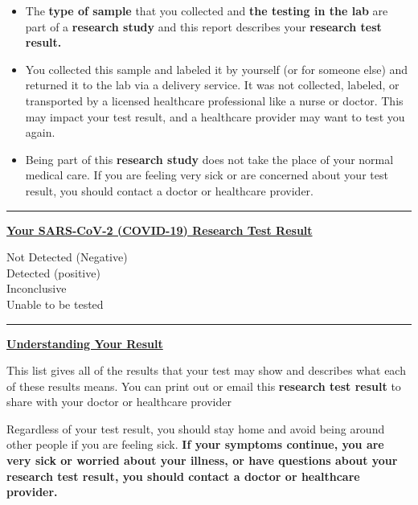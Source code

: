\documentclass[10pt]{article}
\newcommand{\PageLine}{\rule{\textwidth}{0.25mm}}
\begin{document}
\begin{itemize}
\item

  The \textbf{type of sample} that you collected and \textbf{the testing in the
  lab} are part of a \textbf{research study} and this report describes your
  \textbf{research test result.}

\item

  You collected this sample and labeled it by yourself (or for someone else) and
  returned it to the lab via a delivery service. It was not collected, labeled,
  or transported by a licensed healthcare professional like a nurse or doctor.
  This may impact your test result, and a healthcare provider may want to test
  you again.

\item

  Being part of this \textbf{research study} does not take the place of your
  normal medical care. If you are feeling very sick or are concerned about your
  test result, you should contact a doctor or healthcare provider.

\end{itemize}

\bigskip
\PageLine

\large \underline{\textbf{Your SARS-CoV-2 (COVID-19) Research Test Result}}

Not Detected (Negative)\\
Detected (positive)\\
Inconclusive\\
Unable to be tested\\

\PageLine
\bigskip

\large \underline{\textbf{Understanding Your Result}}

This list gives all of the results that your test may show and describes what
each of these results means. You can print out or email this \textbf{research
test result} to share with your doctor or healthcare provider

Regardless of your test result, you should stay home and avoid being around
other people if you are feeling sick. \textbf{If your symptoms continue, you are
very sick or worried about your illness, or have questions about your research
test result, you should contact a doctor or healthcare provider.}
\end{document}

